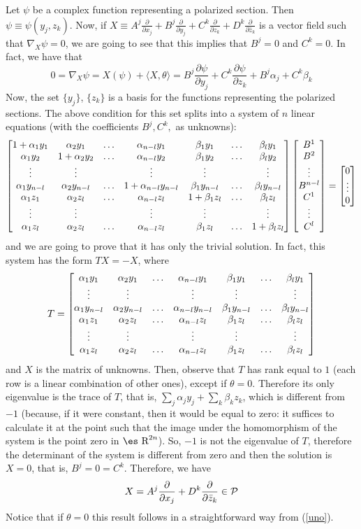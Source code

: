 \documentclass[12pt]{article}
\theoremstyle{plain}
\def\beq{\begin{equation}}
\def\eeq{\end{equation}}
\def\dst{\(}
\def\derpar#1#2{\frac{\partial{#1}}{\partial{#2}}}
\def\qed{\ifvmode\removelastskip\fi
{\unskip\nobreak\hfil\penalty50\hbox{}\nobreak\hfil
\hbox{\vrule height1.2ex width1.2ex}\parfillskip=0pt
\finalhyphendemerits=0 \par\smallskip}}
\def\P{{\cal P}}
\def\Real{\mbox{\es R}}
\begin{document}
Let $\psi$ be a complex function representing a polarized section.
Then $\psi \equiv \psi (y_j,z_k)$. Now, if
\dst X \equiv A^j \derpar{}{x_j} + B^j \derpar{}{y_j}
+ C^k \derpar{}{z_k} + D^k \derpar{}{\bar z_k}\)
is a vector field such that  $\nabla_X\psi = 0$,
we are going to see that this implies that
$B^j=0$ and $C^k=0$.
In fact, we have that
\beq
0 = \nabla_X\psi = X(\psi ) + \langle X,\theta \rangle =
B^j \derpar{\psi}{y_j} + C^k \derpar{\psi}{z_k}
+ B^j\alpha_j + C^k\beta_k
\label{uno}
\eeq
Now, the set $\{ y_j \}$,  $\{ z_k \}$
is a basis for the functions representing the polarized sections.
The above condition for this set splits into
a system of $n$ linear equations
(with the coefficients $B^j, C^k,$
as unknowns):
$$
\left[\begin{matrix}
1+\alpha_1y_1 & \alpha_2y_1 & \ldots & \alpha_{n-l}y_1 &
\beta_1y_1 & \ldots & \beta_ly_1 \cr
\alpha_1y_2 & 1+ \alpha_2y_2 & \ldots & \alpha_{n-l}y_2 &
\beta_1y_2 & \ldots & \beta_ly_2 \cr
\vdots & \vdots & & \vdots & \vdots & & \vdots \cr
\alpha_1y_{n-l} & \alpha_2y_{n-l} & \ldots &1+\alpha_{n-l}y_{n-l} &
\beta_1y_{n-l} & \ldots & \beta_ly_{n-l} \cr
\alpha_1z_1 & \alpha_2z_l & \ldots &\alpha_{n-l}z_l &
1+\beta_1z_l & \ldots & \beta_lz_l \cr
\vdots & \vdots & & \vdots & \vdots & & \vdots \cr
\alpha_1z_l & \alpha_2z_l & \ldots &\alpha_{n-l}z_l &
\beta_1z_l & \ldots & 1+\beta_lz_l \cr
\end{matrix}\right]
\left[\begin{matrix}
B^1 \cr B^2 \cr \vdots \cr B^{n-l} \cr C^1 \cr \vdots \cr C^l\end{matrix}\right]
= \left[\begin{matrix}0 \cr \vdots \cr 0 \cr\end{matrix}\right]
$$
and we are going to prove that it has only
the trivial solution. In fact, this system
has the form $TX=-X$, where
$$
T = \left[\begin{matrix}
\alpha_1y_1 & \alpha_2y_1 & \ldots & \alpha_{n-l}y_1 &
\beta_1y_1 & \ldots & \beta_ly_1 \cr
\vdots & \vdots & & \vdots & \vdots & & \vdots \cr
\alpha_1y_{n-l} & \alpha_2y_{n-l} & \ldots &\alpha_{n-l}y_{n-l} &
\beta_1y_{n-l} & \ldots & \beta_ly_{n-l} \cr
\alpha_1z_1 & \alpha_2z_l & \ldots &\alpha_{n-l}z_l &
\beta_1z_l & \ldots & \beta_lz_l \cr
\vdots & \vdots & & \vdots & \vdots & & \vdots \cr
\alpha_1z_l & \alpha_2z_l & \ldots &\alpha_{n-l}z_l &
\beta_1z_l & \ldots & \beta_lz_l \cr
\end{matrix}\right]
$$
and $X$ is the matrix of unknowns.
Then, observe that $T$ has rank equal to $1$
(each row is a linear combination of other ones),
except if $\theta = 0$.
Therefore its only eigenvalue is the trace of $T$,
that is, $\sum_j\alpha_jy_j+\sum_k\beta_kz_k$,
which is different from $-1$
(because, if it were constant, then it would be equal to zero:
it suffices to calculate it at the point such that
the image under the homomorphism of the system is the
point zero in $\Real^{2n}$).
So, $-1$ is not the eigenvalue of $T$,
therefore the determinant of the system is different from zero
and then the solution is $X=0$,
that is, $B^j = 0 = C^k$.
Therefore, we have
$$
X = A^j \derpar{}{x_j} + D^k \derpar{}{\bar z_k} \in \P
$$
Notice that if $\theta = 0$ this result follows
in a straightforward way from
(\ref{uno}).
\qed
\end{document}

